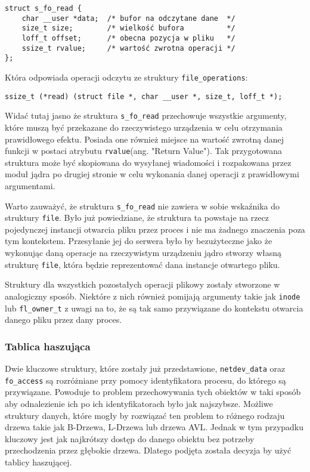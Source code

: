 \documentclass[10pt]{article}
\begin{document}
\begin{verbatim}
struct s_fo_read {
    char __user *data;  /* bufor na odczytane dane  */
    size_t size;        /* wielkość bufora          */
    loff_t offset;      /* obecna pozycja w pliku   */
    ssize_t rvalue;     /* wartość zwrotna operacji */
};
\end{verbatim}

Która odpowiada operacji odczytu ze struktury \texttt{file\_operations}:

\begin{verbatim}
ssize_t (*read) (struct file *, char __user *, size_t, loff_t *);
\end{verbatim}

Widać tutaj jasno że struktura \texttt{s\_fo\_read} przechowuje wszystkie argumenty, które muszą być przekazane do rzeczywistego urządzenia w celu otrzymania prawidłowego efektu. Posiada one również miejsce na wartość zwrotną danej funkcji w postaci atrybutu \texttt{rvalue}(ang. "Return Value"). Tak przygotowana struktura może być skopiowana do wysyłanej wiadomości i rozpakowana przez moduł jądra po drugiej stronie w celu wykonania danej operacji z prawidłowymi argumentami.

Warto zauważyć, że struktura \texttt{s\_fo\_read} nie zawiera w sobie wskaźnika do struktury \texttt{file}. Było już powiedziane, że struktura ta powstaje na rzecz pojedynczej instancji otwarcia pliku przez proces i nie ma żadnego znaczenia poza tym kontekstem. Przesyłanie jej do serwera było by bezużyteczne jako że wykonując daną operacje na rzeczywistym urządzeniu jądro stworzy własną strukturę \texttt{file}, która będzie reprezentować dana instancje otwartego pliku.

Struktury dla wszystkich pozostałych operacji plikowy zostały stworzone w analogiczny sposób. Niektóre z nich również pomijają argumenty takie jak \texttt{inode} lub \texttt{fl\_owner\_t} z uwagi na to, że są tak samo przywiązane do kontekstu otwarcia danego pliku przez dany proces.

\subsubsection{Tablica haszująca}

Dwie kluczowe struktury, które zostały już przedstawione, \texttt{netdev\_data} oraz \texttt{fo\_access} są rozróżniane przy pomocy identyfikatora procesu, do którego są przywiązane. Powoduje to problem przechowywania tych obiektów w taki sposób aby odnalezienie ich po ich identyfikatorach było jak najszybsze. Możliwe struktury danych, które mogły by rozwiązać ten problem to różnego rodzaju drzewa takie jak B-Drzewa, L-Drzewa lub drzewa AVL\@. Jednak w tym przypadku kluczowy jest jak najkrótszy dostęp do danego obiektu bez potrzeby przechodzenia przez głębokie drzewa. Dlatego podjęta została decyzja by użyć tablicy haszującej.
\end{document}
